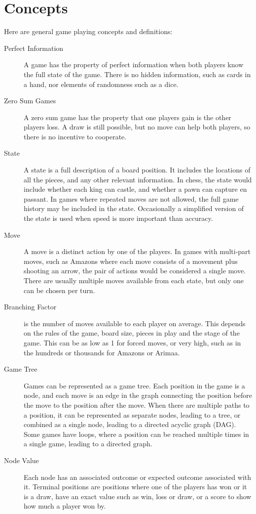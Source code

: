 
\section{Concepts}
Here are general game playing concepts and definitions:

\begin{description}
\item[Perfect Information] A game has the property of perfect information when both players know the full state of the game. There is no hidden information, such as cards in a hand, nor elements of randomness such as a dice.
\item[Zero Sum Games] A zero sum game has the property that one players gain is the other players loss. A draw is still possible, but no move can help both players, so there is no incentive to cooperate.
\item[State] A state is a full description of a board position. It includes the locations of all the pieces, and any other relevant information. In chess, the state would include whether each king can castle, and whether a pawn can capture en passant. In games where repeated moves are not allowed, the full game history may be included in the state. Occasionally a simplified version of the state is used when speed is more important than accuracy.
\item[Move] A move is a distinct action by one of the players. In games with multi-part moves, such as Amazons where each move consists of a movement plus shooting an arrow, the pair of actions would be considered a single move. There are usually multiple moves available from each state, but only one can be chosen per turn.
\item[Branching Factor] is the number of moves available to each player on average. This depends on the rules of the game, board size, pieces in play and the stage of the game. This can be as low as 1 for forced moves, or very high, such as in the hundreds or thousands for Amazons or Arimaa.
\item[Game Tree] Games can be represented as a game tree. Each position in the game is a node, and each move is an edge in the graph connecting the position before the move to the position after the move. When there are multiple paths to a position, it can be represented as separate nodes, leading to a tree, or combined as a single node, leading to a directed acyclic graph (DAG). Some games have loops, where a position can be reached multiple times in a single game, leading to a directed graph.
\item[Node Value] Each node has an associated outcome or expected outcome associated with it. Terminal positions are positions where one of the players has won or it is a draw, have an exact value such as win, loss or draw, or a score to show how much a player won by.

\end{description}
